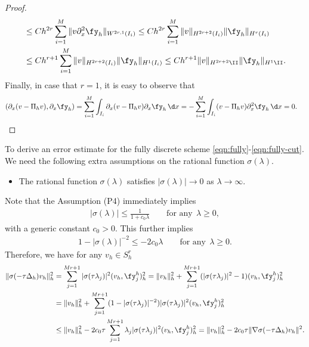 \begin{proof}
\begin{align*}
&\le C h^{2r} \sum_{i=1}^M \|  v  \partial_x^2 \fy_h  \|_{W^{2r,1}(I_i)} \le  C h^{2r} \sum_{i=1}^M \|   v  \|_{H^{2r+2}(I_i)}  \| \fy_h  \|_{H^{r}(I_i)}\\
&\le Ch^{r+1} \sum_{i=1}^M \|   v  \|_{H^{2r+2}(I_i)}  \| \fy_h  \|_{H^{1}(I_i)} \le Ch^{r+1}  \|   v  \|_{H^{2r+2}\II}  \| \fy_h  \|_{H^{1}\II}.
\end{align*}
Finally, in case that $r=1$, it is easy to observe that
\begin{align*}
 ( \partial_x (v- \Pi_h v), \partial_x \fy_h )
 &= \sum_{i=1}^M \int_{I_i}  \partial_x (v- \Pi_h v) \partial_x \fy_h \,\d x
 =-\sum_{i=1}^M \int_{I_i}    (v- \Pi_h v) \partial_x^2 \fy_h \,\d x=0.
\end{align*}
\end{proof}

To derive an error estimate for the fully discrete scheme \eqref{eqn:fully}-\eqref{eqn:fully-cut}. We need the following extra assumptions on the
rational function $\sigma(\lambda)$.
\begin{itemize}
\item[{\bf (P4)}] The rational function $\sigma(\lambda)$ satisfies $|\sigma(\lambda)| \rightarrow 0$ as $\lambda\rightarrow\infty$.
\end{itemize}
Note that the Assumption (P4) immediately implies \cite[eq. (7.37)]{Thomee:2006}
\begin{align*}
 |\sigma(\lambda)| \le \frac{1}{1+c_0\lambda} \qquad \text{for any}~~\lambda\ge 0,
\end{align*}
with a generic constant $c_0>0$. This further implies
\begin{align*}
 1-|\sigma(\lambda)|^{-2} \le - 2 c_0 \lambda\qquad \text{for any}~~\lambda\ge 0.
\end{align*}
Therefore, we have for any $v_h\in S_h^r$
\begin{align*}
 \|  \sigma(-\tau\Delta_h) v_h \|_h^2 &= \sum_{j=1}^{Mr+1} |\sigma(\tau\lambda_j)|^2 (v_h, \fy_j^h)_h^2
 = \|  v_h \|_h^2 +  \sum_{j=1}^{Mr+1} (|\sigma(\tau\lambda_j)|^2-1) (v_h, \fy_j^h)_h^2 \\
 &=\|  v_h \|_h^2 + \sum_{j=1}^{Mr+1} (1-|\sigma(\tau\lambda_j)|^{-2}) |\sigma(\tau\lambda_j)|^2(v_h, \fy_j^h)_h^2\\
 &\le \|  v_h \|_h^2 - 2c_0\tau \sum_{j=1}^{Mr+1}  \lambda_j |\sigma(\tau\lambda_j)|^2(v_h, \fy_j^h)_h^2
 = \|  v_h \|_h^2 - 2c_0\tau \| \nabla \sigma(-\tau\Delta_h) v_h\|^2.
\end{align*}

